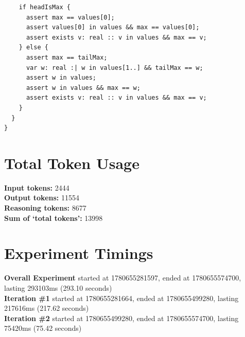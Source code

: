 \documentclass{article}
\begin{document}
\begin{lstlisting}
    if headIsMax {
      assert max == values[0];
      assert values[0] in values && max == values[0];
      assert exists v: real :: v in values && max == v;
    } else {
      assert max == tailMax;
      var w: real :| w in values[1..] && tailMax == w;
      assert w in values;
      assert w in values && max == w;
      assert exists v: real :: v in values && max == v;
    }
  }
}
\end{lstlisting}
\section*{Total Token Usage}
\textbf{Input tokens: }2444
\\\textbf{Output tokens: }11554
\\\textbf{Reasoning tokens: }8677
\\\textbf{Sum of `total tokens': }13998
\section*{Experiment Timings}
\textbf{Overall Experiment} started at 1780655281597, ended at 1780655574700, lasting 293103ms (293.10 seconds)
\\\textbf{Iteration \#1} started at 1780655281664, ended at 1780655499280, lasting 217616ms (217.62 seconds)
\\\textbf{Iteration \#2} started at 1780655499280, ended at 1780655574700, lasting 75420ms (75.42 seconds)
\end{document}
